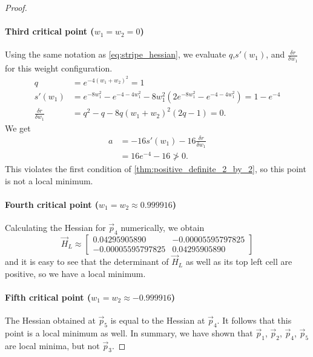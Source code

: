 \begin{proof}
    \paragraph{Third critical point ($w_1=w_2=0$)}
    Using the same notation as \ref{eq:stripe_hessian}, we evaluate 
    $q$,$s'(w_1)$, and $\frac{\delta r}{\delta w_1}$ for this weight configuration.
    \begin{align*}
        q &= e^{-4(w_1+w_2)^2} = 1 \\
        s'(w_1) &= e^{-8 w_1^2} - e^{-4 - 4 w_1^2} - 8 w_1^2 \left(2 e^{-8 w_1^2} - e^{-4-4 w_1^2}\right) = 1 - e^{-4} \\
        \frac{\delta r}{\delta w_1} &= q^2 - q - 8q(w_1 + w_2)^2 (2q - 1) = 0.
    \end{align*}
    We get
    \begin{align*}
        a &= -16s'(w_1) - 16 \frac{\delta r}{\delta w_1} \\
        &= 16 e^{-4} - 16 \ngtr 0.
    \end{align*}
    This violates the first condition of \ref{thm:positive_definite_2_by_2}, so this point is not a local minimum.
    
    \paragraph{Fourth critical point ($w_1=w_2\approx0.999916$)}
    Calculating the Hessian for $\vec{p}_4$ numerically, we obtain
    \begin{equation*}
        \vec{H}_L \approx \begin{bmatrix}
            0.04295905890 & -0.00005595797825 \\
            -0.00005595797825 & 0.04295905890
        \end{bmatrix}
    \end{equation*}
    and it is easy to see that the determinant of $\vec{H}_L$ as well as its top left cell are positive, so we have a local minimum.

    \paragraph{Fifth critical point ($w_1=w_2\approx-0.999916$)}
    The Hessian obtained at $\vec{p}_5$ is equal to the Hessian at $\vec{p}_4$. 
    It follows that this point is a local minimum as well.
    In summary, we have shown that $\vec{p}_1$, $\vec{p}_2$, $\vec{p}_4$, $\vec{p}_5$ are local minima, but not $\vec{p}_3$.
\end{proof}

